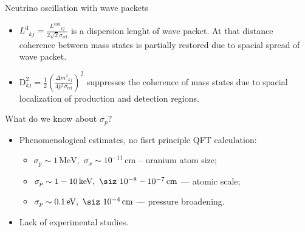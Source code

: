 \documentclass[usenames, dvipsnames]{beamer}
\newcommand{\Lcoh}{\ensuremath{L^{\text{coh}}}}
\newcommand{\Ld}{\ensuremath{L^{\text{d}}}}
\newcommand{\Dm}{\ensuremath{\Delta m^2}}
\newcommand{\Important}{\textcolor{BrickRed}}
\newcommand{\impitem}{\item[\Important{$\bullet$}]}
\newcommand{\sip}{\ensuremath{\sigma_p}}
\newcommand{\six}{\ensuremath{\sigma_x}}
\begin{document}
\begin{frame}[fragile]
\begin{columns}[T]
\begin{column}{.47\textwidth}
\begin{block}{Neutrino oscillation with wave packets}
\begin{itemize}
\begin{itemize}
        \item \Important{$\Ld_{kj}  =
            \frac{\Lcoh_{kj}}{2\sqrt{2}\sigma_{\text{rel}}}$} is a
            \Important{dispersion lenght} of wave packet. At that distance
             coherence between mass states is partially restored due to
             spacial spread of wave packet.
         \item \Important{\ensuremath{ \text{D}^2_{kj} =\frac{1}{2} \left(
             \frac{\Dm_{kj}}{4 p^2\sigma_\text{rel}} \right)^2}} 
         suppresses the coherence of mass states due to spacial localization of production and
             detection regions.
    \end{itemize}
  \end{itemize}
\end{block}


\begin{block}{What do we know about \sip?}
    \begin{itemize}
        \item Phenomenological estimates, no fisrt principle QFT calculation:
        \begin{itemize}
            \item $\sip \sim 1\, \text{MeV}, \,\, \six \sim 10^{-11}\, \text{cm}$
                -- uranium atom size;
            \item $\sip \sim 1-10 \, \text{keV}, \,\, \siz ~ 10^{-8} -
                10^{-7} \, \text{cm}$ --- atomic scale;
            \item $\sip \sim 0.1 \, \text{eV}, \,\, \siz ~ 10^{-4} \, \text{cm}$
                --- pressure broadening.
        \end{itemize}
        \impitem Lack of experimental studies.
    \end{itemize}
\end{block}


\end{column}
\end{columns}
\end{frame}
\end{document}
